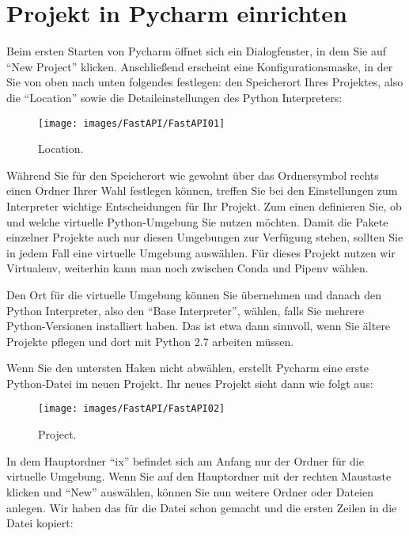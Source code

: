 \section{Projekt in Pycharm einrichten}

Beim ersten Starten von Pycharm öffnet sich ein Dialogfenster, in dem Sie auf ``New Project'' klicken. Anschließend erscheint eine Konfigurationsmaske, in der Sie von oben nach unten folgendes festlegen: den Speicherort Ihres Projektes, also die ``Location'' sowie die Detaileinstellungen des Python Interpreters:

\begin{figure}
  \texttt{[image: images/FastAPI/FastAPI01]}
  \caption{Location.} \label{FastAPI01}
\end{figure}


Während Sie für den Speicherort wie gewohnt über das Ordnersymbol rechts einen Ordner Ihrer Wahl festlegen können, treffen Sie bei den Einstellungen zum Interpreter wichtige Entscheidungen für Ihr Projekt. Zum einen definieren Sie, ob und welche virtuelle Python-Umgebung Sie nutzen möchten. Damit die Pakete einzelner Projekte auch nur diesen Umgebungen zur Verfügung stehen, sollten Sie in jedem Fall eine virtuelle Umgebung auswählen. Für dieses Projekt nutzen wir Virtualenv, weiterhin kann man noch zwischen Conda und Pipenv wählen.

Den Ort für die virtuelle Umgebung können Sie übernehmen und danach den Python Interpreter, also den ``Base Interpreter'', wählen, falls Sie mehrere Python-Versionen installiert haben. Das ist etwa dann sinnvoll, wenn Sie ältere Projekte pflegen und dort mit Python 2.7 arbeiten müssen.

Wenn Sie den untersten Haken nicht abwählen, erstellt Pycharm eine erste Python-Datei im neuen Projekt. Ihr neues Projekt sieht dann wie folgt aus:

\begin{figure}
    \texttt{[image: images/FastAPI/FastAPI02]}
    \caption{Project.} \label{FastAPI02}
\end{figure}



In dem Hauptordner ``ix'' befindet sich am Anfang nur der Ordner für die virtuelle Umgebung. Wenn Sie auf den Hauptordner mit der rechten Maustaste klicken und ``New'' auswählen, können Sie nun weitere Ordner oder Dateien anlegen. Wir haben das für die Datei  schon gemacht und die ersten Zeilen in die Datei kopiert:

